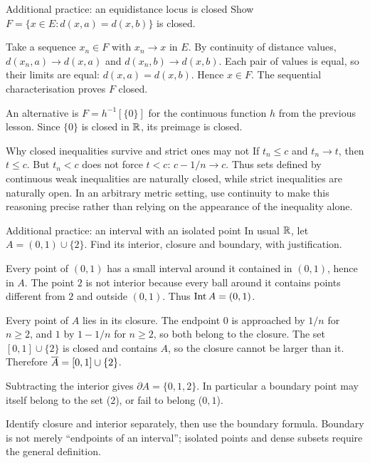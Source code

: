 \begin{exam}{Additional practice: an equidistance locus is closed}
Show $F=\{x\in E:d(x,a)=d(x,b)\}$ is closed.
\end{exam}
\begin{answer}
Take a sequence $x_n\in F$ with $x_n\to x$ in $E$. By continuity of distance values, $d(x_n,a)\to d(x,a)$ and $d(x_n,b)\to d(x,b)$. Each pair of values is equal, so their limits are equal: $d(x,a)=d(x,b)$. Hence $x\in F$. The sequential characterisation proves $F$ closed.

An alternative is $F=h^{-1}[\{0\}]$ for the continuous function $h$ from the previous lesson. Since $\{0\}$ is closed in $\mathbb R$, its preimage is closed.
\end{answer}
\begin{note}{Why closed inequalities survive and strict ones may not}
If $t_n\le c$ and $t_n\to t$, then $t\le c$. But $t_n<c$ does not force $t<c$: $c-1/n\to c$. Thus sets defined by continuous weak inequalities are naturally closed, while strict inequalities are naturally open. In an arbitrary metric setting, use continuity to make this reasoning precise rather than relying on the appearance of the inequality alone.
\end{note}


\begin{exam}{Additional practice: an interval with an isolated point}
In usual $\mathbb R$, let $A=(0,1)\cup\{2\}$. Find its interior, closure and boundary, with justification.
\end{exam}
\begin{answer}
Every point of $(0,1)$ has a small interval around it contained in $(0,1)$, hence in $A$. The point $2$ is not interior because every ball around it contains points different from $2$ and outside $(0,1)$. Thus $\operatorname{Int} A=(0,1)$.

Every point of $A$ lies in its closure. The endpoint $0$ is approached by $1/n$ for $n\ge2$, and $1$ by $1-1/n$ for $n\ge2$, so both belong to the closure. The set $[0,1]\cup\{2\}$ is closed and contains $A$, so the closure cannot be larger than it. Therefore $\overline{A}=[0,1]\cup\{2\}$.

Subtracting the interior gives $\partial A=\{0,1,2\}$. In particular a boundary point may itself belong to the set ($2$), or fail to belong ($0,1$).
\end{answer}
\begin{tip}
Identify closure and interior separately, then use the boundary formula. Boundary is not merely ``endpoints of an interval''; isolated points and dense subsets require the general definition.
\end{tip}



